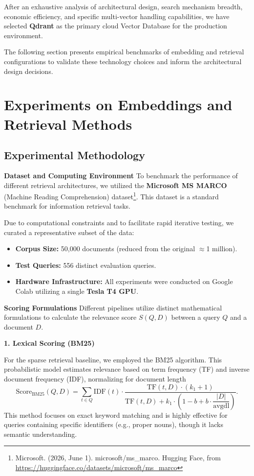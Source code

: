 After an exhaustive analysis of architectural design, search mechanism breadth, economic efficiency, and specific multi-vector handling capabilities, we have selected \textbf{Qdrant} as the primary cloud Vector Database for the production environment.

The following section presents empirical benchmarks of embedding and retrieval configurations to validate these technology choices and inform the architectural design decisions.

\section{Experiments on Embeddings and Retrieval Methods}

\subsection{Experimental Methodology}

\textbf{Dataset and Computing Environment}
To benchmark the performance of different retrieval architectures, we utilized the \textbf{Microsoft MS MARCO} (Machine Reading Comprehension) dataset\footnote{Microsoft. (2026, June 1). microsoft/ms\_marco. Hugging Face, from \url{https://huggingface.co/datasets/microsoft/ms_marco}}. This dataset is a standard benchmark for information retrieval tasks.

Due to computational constraints and to facilitate rapid iterative testing, we curated a representative subset of the data:
\begin{itemize}
    \item \textbf{Corpus Size:} 50,000 documents (reduced from the original $\approx$1 million).
    \item \textbf{Test Queries:} 556 distinct evaluation queries.
    \item \textbf{Hardware Infrastructure:} All experiments were conducted on Google Colab utilizing a single \textbf{Tesla T4 GPU}.
\end{itemize}

\textbf{Scoring Formulations}
Different pipelines utilize distinct mathematical formulations to calculate the relevance score $S(Q, D)$ between a query $Q$ and a document $D$.

\textbf{1. Lexical Scoring (BM25)}

For the sparse retrieval baseline, we employed the BM25 algorithm. This probabilistic model estimates relevance based on term frequency (TF) and inverse document frequency (IDF), normalizing for document length
\begin{equation*}
    \text{Score}_{\text{BM25}}(Q, D) = \sum_{t \in Q} \text{IDF}(t) \cdot \dfrac{\text{TF}(t, D) \cdot (k_1 + 1)}{\text{TF}(t, D) + k_1 \cdot \left(1 - b + b \cdot \dfrac{|D|}{\text{avgdl}}\right)}.
\end{equation*}
This method focuses on exact keyword matching and is highly effective for queries containing specific identifiers (e.g., proper nouns), though it lacks semantic understanding.

